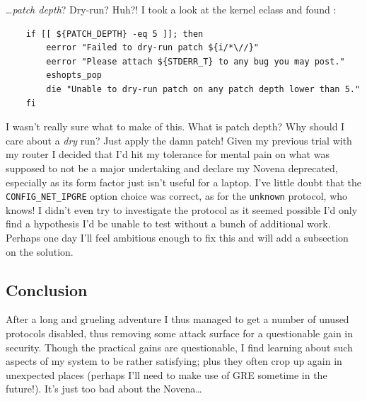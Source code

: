 \documentclass{article}
\begin{document}
\ldots \emph{patch depth}?  Dry-run?  Huh?!  I took a look at the kernel eclass and found :

\begin{verbatim}
	if [[ ${PATCH_DEPTH} -eq 5 ]]; then
		eerror "Failed to dry-run patch ${i/*\//}"
		eerror "Please attach ${STDERR_T} to any bug you may post."
		eshopts_pop
		die "Unable to dry-run patch on any patch depth lower than 5."
	fi
\end{verbatim}

I wasn't really sure what to make of this.  What is patch depth?  Why should I care about a \emph{dry} run?  Just apply the damn patch!  Given my previous trial with my router I decided that I'd hit my tolerance for mental pain on what was supposed to not be a major undertaking and declare my Novena deprecated, especially as its form factor just isn't useful for a laptop.  I've little doubt that the \texttt{CONFIG_NET_IPGRE} option choice was correct, as for the \texttt{unknown} protocol, who knows!  I didn't even try to investigate the protocol as it seemed possible I'd only find a hypothesis I'd be unable to test without a bunch of additional work.  Perhaps one day I'll feel ambitious enough to fix this and will add a subsection on the solution.

\subsection{Conclusion}
After a long and grueling adventure I thus managed to get a number of unused protocols disabled, thus removing some attack surface for a questionable gain in security.  Though the practical gains are questionable, I find learning about such aspects of my system to be rather satisfying; plus they often crop up again in unexpected places (perhaps I'll need to make use of GRE sometime in the future!).  It's just too bad about the Novena\ldots


\end{document}
